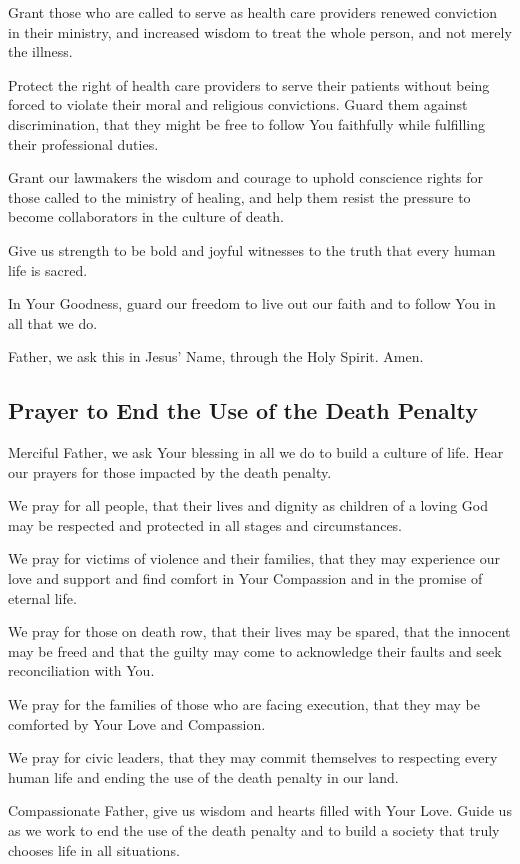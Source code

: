 \documentclass[12pt]{article}
\newcommand{\prayertitle}[1]{\subsection{#1}}
\begin{document}
Grant those who are called to serve as health care providers renewed conviction in their ministry, and increased wisdom to treat the whole person, and not merely the illness.

Protect the right of health care providers to serve their patients without being forced to violate their moral and religious convictions.
Guard them against discrimination, that they might be free to follow You faithfully while fulfilling their professional duties.

Grant our lawmakers the wisdom and courage to uphold conscience rights for those called to the ministry of healing, and help them resist the pressure to become collaborators in the culture of death.

Give us strength to be bold and joyful witnesses to the truth that every human life is sacred.

In Your Goodness, guard our freedom to live out our faith and to follow You in all that we do.

Father, we ask this in Jesus' Name, through the Holy Spirit. Amen.

\prayertitle{Prayer to End the Use of the Death Penalty}
Merciful Father, we ask Your blessing in all we do to build a culture of life.
Hear our prayers for those impacted by the death penalty.

We pray for all people, that their lives and dignity as children of a loving God may be respected and protected in all stages and circumstances.

We pray for victims of violence and their families, that they may experience our love and support and find comfort in Your Compassion and in the promise of eternal life.

We pray for those on death row, that their lives may be spared, that the innocent may be freed and that the guilty may come to acknowledge their faults and seek reconciliation with You.

We pray for the families of those who are facing execution, that they may be comforted by Your Love and Compassion.

We pray for civic leaders, that they may commit themselves to respecting every human life and ending the use of the death penalty in our land.

Compassionate Father, give us wisdom and hearts filled with Your Love.
Guide us as we work to end the use of the death penalty and to build a society that truly chooses life in all situations.
\end{document}
